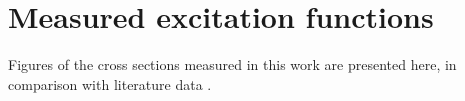 % 
% 
\section{Measured excitation functions} \label{sec:fe_xs_figures}

Figures of the cross sections measured in this work are presented here, in comparison with literature data
\cite{Al-Abyad2009,A2006,Aleksandrov1987,barchuk1987excitation,Barrandon1975,Belhout2007,Brodzinski1971,Brodzinski1971a,daum1997investigation,Ditroi2005,Fink1990,Garrido2016,Graves2016,Greenwood1984,Grutter1982,Jung1987,Khandaker2009,Kim2014,Kopecky1993,Lagunas-Solar1979a,levkovski1991cross,MICHEL1997153,MICHEL1979a,Michel1980,Michel1978,Michel1985,Mills1992,Neumann1999a,Schoen1979a,Shahid2015,Sudar1994,Takacs1994a,Voyles2018a,PhysRev.162.1055,YashimaH2003,Zarie2006a,zhao1993measurement}.







